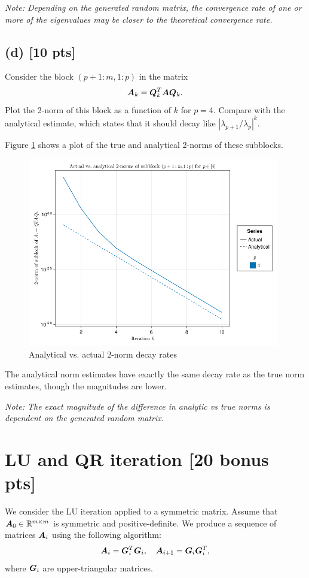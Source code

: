 \documentclass[twoside,10pt]{article}
\begin{document}
    \textit{Note: Depending on the generated random matrix, the convergence rate of one or more of the eigenvalues may be closer to the theoretical convergence rate.}
 
  \subsection*{(d) [10 pts]}
    Consider the block $(p + 1 : m, 1 : p)$ in the matrix 
    \begin{equation}
      \bm{A}_k = \bm{Q}^T_{k} \bm{A} \bm{Q}_{k}.
    \end{equation}
    Plot the 2-norm of this block as a function of $k$ for $p = 4$. Compare with the analytical estimate, which states that it should decay like $|\lambda_{p + 1} / \lambda_p|^k$.

    Figure \ref{fig:figure2} shows a plot of the true and analytical 2-norms of these subblocks.

    \begin{figure}[htb]
      \begin{center}
      \includegraphics[width=110mm]{HW5_code/norms_final.png}
      \end{center}
      \caption{Analytical vs. actual 2-norm decay rates}
      \label{fig:figure2}
    \end{figure}

    The analytical norm estimates have exactly the same decay rate as the true norm estimates, though the magnitudes are lower.
  
    \textit{Note: The exact magnitude of the difference in analytic vs true norms is dependent on the generated random matrix.}

\section{LU and QR iteration [20 bonus pts]}
We consider the LU iteration applied to a symmetric matrix. Assume that $\bm{A}_0 \in \mathbb{R}^{m \times m}$ is symmetric and positive-definite. 
We produce a sequence of matrices $\bm{A}_i$ using the following algorithm:
\begin{equation}
  \bm{A}_i = \bm{G}^T_i \bm{G}_i, \quad \bm{A}_{i + 1} = \bm{G}_i \bm{G}_i^T, 
\end{equation}
where $\bm{G}_i$ are upper-triangular matrices.
\end{document}
